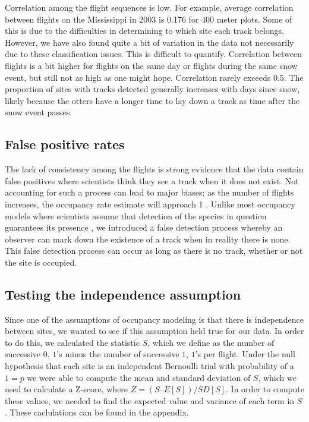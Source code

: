 \documentclass[12pt]{article}
\begin{document}
    Correlation among the flight sequences is low. For example, average
    correlation between flights on the Mississippi in 2003 is 0.176 for 400
    meter plots. Some of this is due to the difficulties in determining to which
    site each track belongs. However, we have also found quite a bit of
    variation in the data not necessarily due to these classification issues.
    This is difficult to quantify. Correlation between flights is a bit higher 
    for
    flights on the same day or flights during the same snow event, but still not
    as high as one might hope. Correlation rarely exceeds 0.5. The proportion of 
    sites with tracks detected
    generally increases with days since snow, likely because the otters have a
    longer time to lay down a track as time after the snow event passes.

    \subsection{False positive rates}
    The lack of consistency among the flights is strong evidence that the data
    contain false positives where scientists think they see a track when it does
    not exist. Not accounting for such a process can lead to major biases; as
    the number of flights increases, the occupancy rate estimate will approach
    1 \cite{Royle2006}. Unlike most occupancy models where scientists assume 
    that detection of the species in question guarantees its presence \cite
    {MacKenzie2006}, we introduced a false detection process whereby an observer 
    can mark down the existence of a track when in reality there is none. This 
    false detection process can occur as long as there is no track, whether or 
    not the site is occupied.

    \subsection{Testing the independence assumption}
    \label{shat}
    Since one of the assumptions of occupancy modeling is that there is 
	independence between sites, we wanted to see if this assumption held true 
	for our data.  In order to do this, we calculated the statistic \(S\), which
	we define as the number of successive \(0\), \(1\)'s minus the number of
    successive \(1\), \(1\)'s per flight. Under the null hypothesis that each
    site is an independent Bernoulli trial with probability of a \(1 = p\) we were able
    to compute the mean and standard deviation of \(S\), which we used to
    calculate a Z-score, where \(Z = (S – E[S])/SD[S]\). In order to compute these values, we needed to find the
    expected value and variance of each term in \(S\). These caclulations can be
	found in the appendix.  
\end{document}
